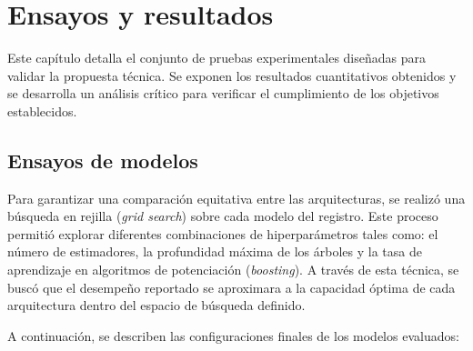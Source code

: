 
\chapter{Ensayos y resultados} %

\label{Chapter4} %

Este capítulo detalla el conjunto de pruebas experimentales diseñadas para validar la propuesta técnica. Se exponen los resultados cuantitativos obtenidos y se desarrolla un análisis crítico para verificar el cumplimiento de los objetivos establecidos.



\section{Ensayos de modelos}
\label{sec:pruebasHW}

Para garantizar una comparación equitativa entre las arquitecturas, se realizó una búsqueda en rejilla (\textit{grid search}) sobre cada modelo del registro. Este proceso permitió explorar diferentes combinaciones de hiperparámetros tales como: el número de estimadores, la profundidad máxima de los árboles y la tasa de aprendizaje en algoritmos de potenciación (\textit{boosting}). A través de esta técnica, se buscó que el desempeño reportado se aproximara a la capacidad óptima de cada arquitectura dentro del espacio de búsqueda definido. 

A continuación, se describen las configuraciones finales de los modelos evaluados:


